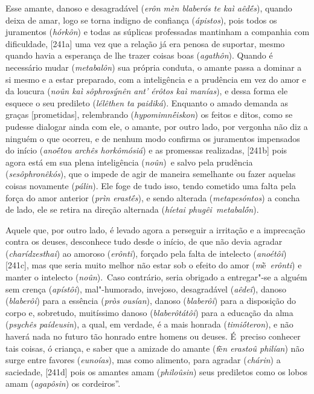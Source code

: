 Esse amante, danoso e desagradável (\emph{erôn mèn blaberós te kaì
aêdḗs}), quando deixa de amar, logo se torna indigno de confiança
(\emph{ápistos}), pois todos os juramentos (\emph{hórkôn}) e todas as
súplicas professadas mantinham a companhia com dificuldade, [241a]
uma vez que a relação já era penosa de suportar, mesmo quando havia a
esperança de lhe trazer coisas boas (\emph{agathôn}). Quando é
necessário mudar (\emph{metabalôn}) sua própria conduta, o amante passa
a dominar a si mesmo e a estar preparado, com a inteligência e a
prudência em vez do amor e da loucura (\emph{noûn kaì sôphrosýnên ant'
érôtos kaì manías}), e dessa forma ele esquece o seu predileto
(\emph{lélêthen ta paidiká}). Enquanto o amado demanda as graças
[prometidas], relembrando (\emph{hypomimnḗiskon}) os feitos e ditos,
como se pudesse dialogar ainda com ele, o amante, por outro lado, por
vergonha não diz a ninguém o que ocorreu, e de nenhum modo confirma os
juramentos impensados do início (\emph{anoḗtou archês horkômósiá}) e as
promessas realizadas, [241b] pois agora está em sua plena
inteligência (\emph{noûn})~e salvo pela prudência
(\emph{sesôphronêkós}), que o impede de agir de maneira semelhante ou
fazer aquelas coisas novamente (\emph{pálin}). Ele foge de tudo isso,
tendo cometido uma falta pela força do amor anterior (\emph{prìn
erastḗs}), e sendo alterada (\emph{metapesóntos}) a concha de lado, ele
se retira na direção alternada (\emph{híetai phugêi~metabalṓn}).

Aquele que, por outro lado, é levado agora a perseguir a irritação e a
imprecação contra os deuses, desconhece tudo desde o início, de que não
devia agradar (\emph{charídzesthai}) ao amoroso (\emph{erônti}), forçado
pela falta de intelecto (\emph{anoétôi}) [241c], mas que seria muito
melhor não estar sob o efeito do amor (\emph{m}ḕ~\emph{erônti}) e manter
o intelecto (\emph{noûn}).~Caso contrário, seria obrigado a entregar"-se
a alguém sem crença (\emph{apístôi}), mal"-humorado, invejoso,
desagradável (\emph{aêdeî}), danoso (\emph{blaberôi}) para a essência
(\emph{pròs ousían}), danoso (\emph{blaberôi}) para a disposição do
corpo e, sobretudo, muitíssimo danoso (\emph{blaberôtátôi}) para a
educação da alma (\emph{psychês paídeusin}), a qual, em verdade, é a mais
honrada (\emph{timiṓteron}), e não haverá nada no futuro tão honrado
entre homens ou deuses. É~preciso conhecer tais coisas, ó criança, e
saber que a amizade do amante (\emph{t}ḕ\emph{n erastoû philían}) não
surge entre favores (\emph{eunoías}), mas como alimento, para agradar
(\emph{chárin}) a saciedade, [241d] pois os amantes amam
(\emph{philoûsin}) seus prediletos como os lobos amam (\emph{agapôsin})
os cordeiros''.

